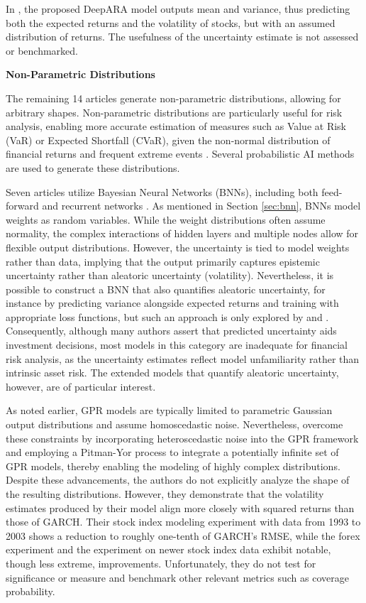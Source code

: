 In \textcite{Li2024DeepAR}, the proposed DeepARA model outputs mean and variance, thus predicting both the expected returns and the volatility of stocks, but with an assumed distribution of returns. The usefulness of the uncertainty estimate is not assessed or benchmarked.

\textbf{Non-Parametric Distributions}

The remaining 14 articles generate non-parametric distributions, allowing for arbitrary shapes. Non-parametric distributions are particularly useful for risk analysis, enabling more accurate estimation of measures such as Value at Risk (VaR) or Expected Shortfall (CVaR), given the non-normal distribution of financial returns and frequent extreme events \parencite{Peir1994TheDO}. Several probabilistic AI methods are used to generate these distributions.

Seven articles utilize Bayesian Neural Networks (BNNs), including both feed-forward and recurrent networks \parencite{cocco2021predictions, Hassan2024Bitcoin, Golnari2024Cryptocurrency, soleymani2022longterm, Dixon2022Industrial, chandra2021bayesian, hortua2024forecasting}. As mentioned in Section \ref{sec:bnn}, BNNs model weights as random variables. While the weight distributions often assume normality, the complex interactions of hidden layers and multiple nodes allow for flexible output distributions. However, the uncertainty is tied to model weights rather than data, implying that the output primarily captures epistemic uncertainty rather than aleatoric uncertainty (volatility). Nevertheless, it is possible to construct a BNN that also quantifies aleatoric uncertainty, for instance by predicting variance alongside expected returns and training with appropriate loss functions, but such an approach is only explored by \textcite{hortua2024forecasting} and \textcite{soleymani2022longterm}. Consequently, although many authors assert that predicted uncertainty aids investment decisions, most models in this category are inadequate for financial risk analysis, as the uncertainty estimates reflect model unfamiliarity rather than intrinsic asset risk. The extended models that quantify aleatoric uncertainty, however, are of particular interest.

As noted earlier, GPR models are typically limited to parametric Gaussian output distributions and assume homoscedastic noise. Nevertheless, \textcite{Platanios2014gpr} overcome these constraints by incorporating heteroscedastic noise into the GPR framework and employing a Pitman-Yor process to integrate a potentially infinite set of GPR models, thereby enabling the modeling of highly complex distributions. Despite these advancements, the authors do not explicitly analyze the shape of the resulting distributions. However, they demonstrate that the volatility estimates produced by their model align more closely with squared returns than those of GARCH. Their stock index modeling experiment with data from 1993 to 2003 shows a reduction to roughly one-tenth of GARCH's RMSE, while the forex experiment and the experiment on newer stock index data exhibit notable, though less extreme, improvements. Unfortunately, they do not test for significance or measure and benchmark other relevant metrics such as coverage probability.

